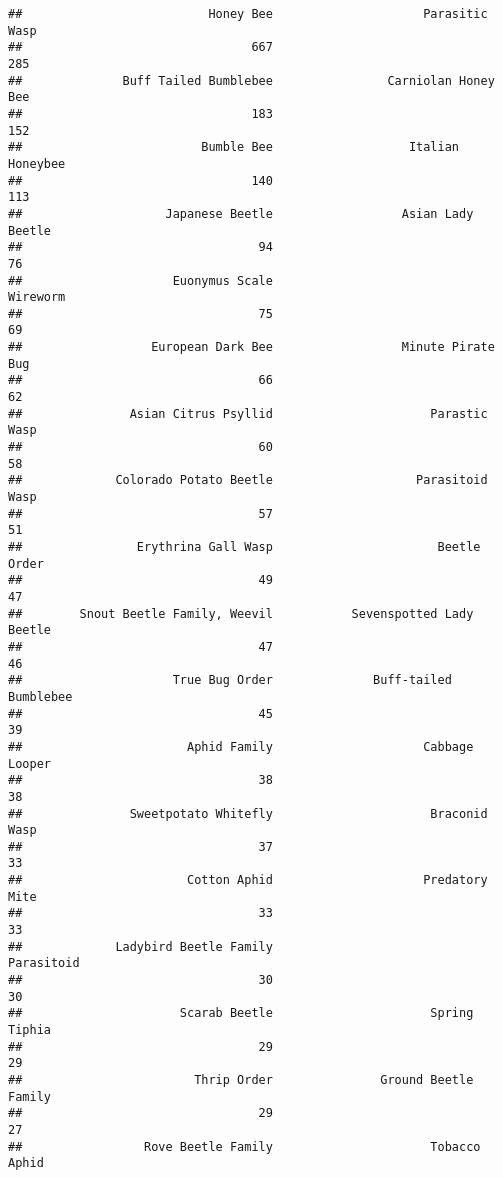 \documentclass[
]{article}
\begin{document}
\begin{verbatim}
##                          Honey Bee                     Parasitic Wasp 
##                                667                                285 
##              Buff Tailed Bumblebee                Carniolan Honey Bee 
##                                183                                152 
##                         Bumble Bee                   Italian Honeybee 
##                                140                                113 
##                    Japanese Beetle                  Asian Lady Beetle 
##                                 94                                 76 
##                     Euonymus Scale                           Wireworm 
##                                 75                                 69 
##                  European Dark Bee                  Minute Pirate Bug 
##                                 66                                 62 
##               Asian Citrus Psyllid                      Parastic Wasp 
##                                 60                                 58 
##             Colorado Potato Beetle                    Parasitoid Wasp 
##                                 57                                 51 
##                Erythrina Gall Wasp                       Beetle Order 
##                                 49                                 47 
##        Snout Beetle Family, Weevil           Sevenspotted Lady Beetle 
##                                 47                                 46 
##                     True Bug Order              Buff-tailed Bumblebee 
##                                 45                                 39 
##                       Aphid Family                     Cabbage Looper 
##                                 38                                 38 
##               Sweetpotato Whitefly                      Braconid Wasp 
##                                 37                                 33 
##                       Cotton Aphid                     Predatory Mite 
##                                 33                                 33 
##             Ladybird Beetle Family                         Parasitoid 
##                                 30                                 30 
##                      Scarab Beetle                      Spring Tiphia 
##                                 29                                 29 
##                        Thrip Order               Ground Beetle Family 
##                                 29                                 27 
##                 Rove Beetle Family                      Tobacco Aphid 

\end{verbatim}
\end{document}

